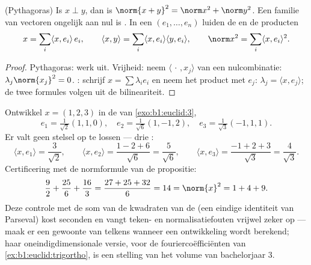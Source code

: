 \begin{proposition}\label{prop:b1:euclid:orthfree}
(Pythagoras) Is $x \perp y$, dan is
$\norm{x+y}^2 = \norm x^2 + \norm y^2$. Een  familie van
vectoren ongelijk aan nul is . In een   $(e_1,
\dots, e_n)$ luiden de  en de producten
\[
x = \sum_{i} \langle x, e_i\rangle\, e_i,
\qquad
\langle x, y \rangle = \sum_i \langle x, e_i\rangle \langle y,
e_i\rangle,
\qquad
\norm x^2 = \sum_i \langle x, e_i\rangle^2 .
\]
\end{proposition}

\begin{proof}
Pythagoras: werk uit. Vrijheid: neem $\langle\,\cdot\,, x_j\rangle$
van een nulcombinatie: $\lambda_j \norm{x_j}^2 = 0$. :
schrijf $x = \sum \lambda_i e_i$ en neem het product met $e_j$:
$\lambda_j = \langle x, e_j\rangle$; de twee formules volgen uit de
bilineariteit.
\end{proof}

\begin{example}
\label{ex:b1:euclid:parsevalcheck}
Ontwikkel $x = (1, 2, 3)$ in de   van
\cref{exo:b1:euclid:3},
\[
e_1 = \tfrac{1}{\sqrt2}(1,1,0), \quad
e_2 = \tfrac{1}{\sqrt6}(1,-1,2), \quad
e_3 = \tfrac{1}{\sqrt3}(-1,1,1).
\]
Er valt geen stelsel op te lossen --- drie :
\[
\langle x, e_1\rangle = \frac{3}{\sqrt2},
\qquad
\langle x, e_2\rangle = \frac{1 - 2 + 6}{\sqrt6} =
\frac{5}{\sqrt6},
\qquad
\langle x, e_3\rangle = \frac{-1 + 2 + 3}{\sqrt3} =
\frac{4}{\sqrt3}.
\]
Certificering met de normformule van de propositie:
\[
\frac{9}{2} + \frac{25}{6} + \frac{16}{3}
= \frac{27 + 25 + 32}{6} = 14 = \norm{x}^2 = 1 + 4 + 9 .
\]
Deze controle met de som van de kwadraten van de  (een
eindige identiteit van Parseval) kost seconden en vangt teken- en
normalisatiefouten vrijwel zeker op --- maak er een gewoonte van
telkens wanneer een  ontwikkeling wordt berekend; haar
oneindigdimensionale versie, voor de fouriercoëfficiënten van
\cref{ex:b1:euclid:trigortho}, is een stelling van het volume van
bachelorjaar 3.
\end{example}

